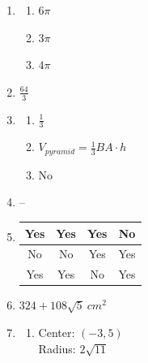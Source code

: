 \documentclass{article}
\begin{document}
\begin{enumerate}
\begin{enumerate}
	\item $18 \pi$
	
	\item $9 \pi$
	
	\item $12 \pi$
	
	\end{enumerate}
	
\item

	\begin{enumerate}
	
	\item $6 \pi$
	
	\item $3 \pi$
	
	\item $4 \pi$
	
	\end{enumerate}
	
\item $\frac{64}{3}$

\item

	\begin{enumerate}
	
	\item $\frac{1}{3}$
	
	\item $V_{pyramid} = \frac{1}{3}BA \cdot h$
	
	\item No
	
	\end{enumerate}
	
\item --

\item
	\begin{tabular}{| c | c | c | c |}
	\hline
	Yes & Yes & Yes & No \\
	\hline
	No & No & Yes & Yes \\
	\hline
	Yes & Yes & No & Yes \\
	\hline
	\end{tabular}
	
\item $324 + 108\sqrt{5} \ cm^2$

\item

	\begin{enumerate}
	
	\item Center: $(-3, 5)$ \\
		Radius: $2\sqrt{11}$
		

\end{enumerate}
\end{enumerate}
\end{document}
